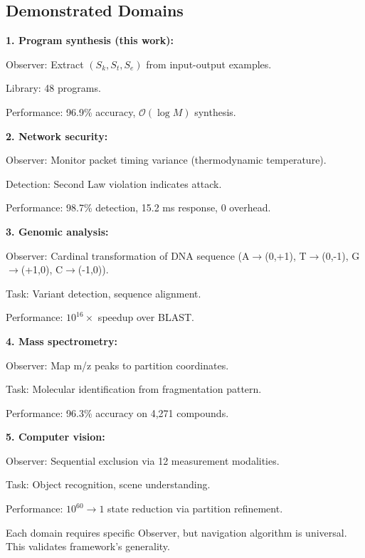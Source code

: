 \documentclass[twocolumn,10pt]{article}
\theoremstyle{definition}
\theoremstyle{remark}
\newcommand{\Sk}{S_k}
\newcommand{\St}{S_t}
\newcommand{\Se}{S_e}
\newcommand{\bigO}{\mathcal{O}}
\begin{document}
\subsection{Demonstrated Domains}

\textbf{1. Program synthesis (this work):}

Observer: Extract $(\Sk, \St, \Se)$ from input-output examples.

Library: 48 programs.

Performance: 96.9\% accuracy, $\bigO(\log M)$ synthesis.

\vspace{0.2cm}
\noindent\textbf{2. Network security:}

Observer: Monitor packet timing variance (thermodynamic temperature).

Detection: Second Law violation indicates attack.

Performance: 98.7\% detection, 15.2 ms response, 0 overhead.

\vspace{0.2cm}
\noindent\textbf{3. Genomic analysis\cite{sachikonye2024genomics}:}

Observer: Cardinal transformation of DNA sequence (A$\to$(0,+1), T$\to$(0,-1), G$\to$(+1,0), C$\to$(-1,0)).

Task: Variant detection, sequence alignment.

Performance: $10^{16}\times$ speedup over BLAST.

\vspace{0.2cm}
\noindent\textbf{4. Mass spectrometry\cite{sachikonye2024mass}:}

Observer: Map m/z peaks to partition coordinates.

Task: Molecular identification from fragmentation pattern.

Performance: 96.3\% accuracy on 4,271 compounds.

\vspace{0.2cm}
\noindent\textbf{5. Computer vision\cite{sachikonye2024vision}:}

Observer: Sequential exclusion via 12 measurement modalities.

Task: Object recognition, scene understanding.

Performance: $10^{60} \to 1$ state reduction via partition refinement.

\vspace{0.2cm}
\noindent Each domain requires specific Observer, but navigation algorithm is universal. This validates framework's generality.
\end{document}
